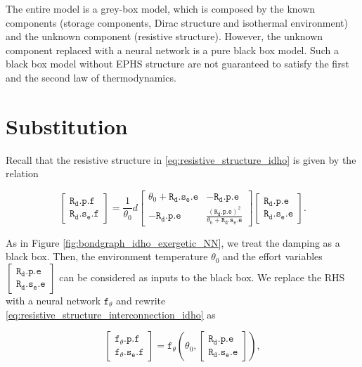 \documentclass[
	parskip, 			   %
	twoside, 			   %
	DIV=14, 			   %
	BCOR=15.0mm, 		   %
	headsepline, 		   %
	open=right, 		   %
	captions=tableheading, %
	bibliography=totoc,    %
	numbers=noenddot       %
]{scrreprt}
\begin{document}
The entire model is a grey-box model, which is composed by the known components (storage components, Dirac structure and isothermal environment) and the unknown component (resistive structure). However, the unknown component replaced with a neural network is a pure black box model. Such a black box model without EPHS structure are not guaranteed to satisfy the first and the second law of thermodynamics.


\section{Substitution}

Recall that the resistive structure in \ref{eq:resistive_structure_idho} is given by the relation

\begin{equation}
    \label{eq:resistive_structure_interconnection_idho}
    \left[\begin{array}{l}\mathtt{R_{d}.p.f} \\ \mathtt{R_{d}.s_{e}.f}\end{array}\right]=\frac{1}{\theta_0} d\left[\begin{array}{rr}\theta_0+\mathtt{R_{d}.s_{e}.e} & -\mathtt{R_{d}.p.e} \\ -\mathtt{R_{d}.p.e} & \frac{(\mathtt{R_{d}.p.e})^2}{\theta_0+\mathtt{R_{d}.s_{e}.e}}\end{array}\right]\left[\begin{array}{l}\mathtt{R_{d}.p.e} \\ \mathtt{R_{d}.s_{e}.e}\end{array}\right].
\end{equation}

As in Figure \ref{fig:bondgraph_idho_exergetic_NN}, we treat the damping as a black box. Then, the environment temperature $\theta_0$ and the effort variables $\left[\begin{array}{l}\mathtt{R_{d}.p.e} \\ \mathtt{R_{d}.s_{e}.e}\end{array}\right]$ can be considered as inputs to the black box. We replace the RHS with a neural network $\mathtt{f_{\theta}}$ and rewrite \ref{eq:resistive_structure_interconnection_idho} as

\begin{equation}
    \label{eq:resistive_structure_interconnection_NN_idho}
    \left[\begin{array}{l}\mathtt{f_{\theta}.p.f} \\ \mathtt{f_{\theta}.s_{e}.f}\end{array}\right]= \mathtt{f_{\theta}} \left(\theta_0, 
    \left[\begin{array}{l}\mathtt{R_{d}.p.e} \\ \mathtt{R_{d}.s_{e}.e}\end{array}\right] \right),
\end{equation}
\end{document}

